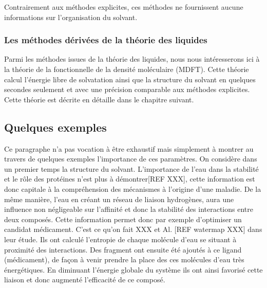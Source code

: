 Contrairement aux méthodes explicites, ces méthodes ne fournissent aucune informations sur l'organisation du solvant.


\subsubsection{Les méthodes dérivées de la théorie des liquides}
Parmi les méthodes issues de la théorie des liquides, nous nous intéresserons ici à la théorie de la fonctionnelle de la densité moléculaire (MDFT). Cette théorie calcul l'énergie libre de solvatation ainsi que la structure du solvant en quelques secondes seulement et avec une précision comparable aux méthodes explicites. Cette théorie est décrite en détaille dans le chapitre suivant.




\subsection{Quelques exemples}
Ce paragraphe n'a pas vocation à être exhaustif mais simplement à montrer au travers de quelques exemples l'importance de ces paramètres. On considère dans un premier temps la structure du solvant. L'importance de l'eau dans la stabilité et le rôle des protéines n'est plus à démontrer[REF XXX], cette information est donc capitale à la compréhension des mécanismes à l'origine d'une maladie. De la même manière, l'eau en créant un réseau de liaison hydrogènes, aura une influence non négligeable sur l'affinité et donc la stabilité des interactions entre deux composés. Cette information permet donc par exemple d'optimiser un candidat médicament. C'est ce qu'on fait XXX et Al. [REF watermap XXX] dans leur étude. Ils ont calculé l’entropie de chaque molécule d'eau se situant à proximité des interactions. Des fragment ont ensuite été ajoutés à ce ligand (médicament), de façon à venir prendre la place des ces molécules d'eau très énergétiques. En diminuant l'énergie globale du système ils ont ainsi favorisé cette liaison et donc augmenté l'efficacité de ce composé.

